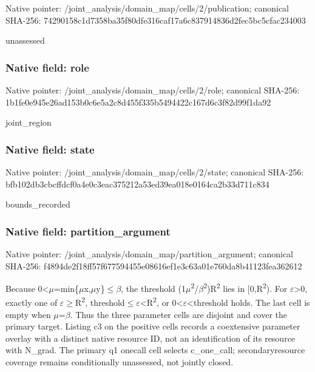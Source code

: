 \documentclass[10pt,a4paper]{article}
\begin{document}
Native pointer: /joint\_analysis/domain\_m\allowbreak{}ap/cells/2/publication; canonical SHA-256: 74290158c1d7358ba35f80df\allowbreak{}e316caf17a6c837914836d2f\allowbreak{}ec5bc5cfac234003


unassessed


\subsubsection{Native field: role}


Native pointer: /joint\_analysis/domain\_map/cells/2/role; canonical SHA-256: 1b1fe0e945e26ad153b0c6e5\allowbreak{}a2c8d455f335b5494422c167\allowbreak{}d6c3f82d99f1da92


joint\_region


\subsubsection{Native field: state}


Native pointer: /joint\_analysis/domain\_m\allowbreak{}ap/cells/2/state; canonical SHA-256: bfb102db3cbcffdcf0a4e0c3\allowbreak{}eac375212a53ed39ea018e01\allowbreak{}64ca2b33d711c834


bounds\_recorded


\subsubsection{Native field: partition\_argument}


Native pointer: /joint\_analysis/domain\_m\allowbreak{}ap/partition\_argument; canonical SHA-256: f4894de2f18ff57f67759445\allowbreak{}5e08616ef1e3c63a01e760da\allowbreak{}8b41123fea362612


Because 0<\ensuremath{\mu}=min\{\ensuremath{\mu}x,\ensuremath{\mu}y\}\ensuremath{\le}\ensuremath{\beta}, the threshold (1\ensuremath{\mu}\textsuperscript{2}/\ensuremath{\beta}\textsuperscript{2})R\textsuperscript{2} lies in [0,R\textsuperscript{2}). For \ensuremath{\varepsilon}>0, exactly one of \ensuremath{\varepsilon}\ensuremath{\ge}R\textsuperscript{2}, threshold\ensuremath{\le}\ensuremath{\varepsilon}<R\textsuperscript{2}, or 0<\ensuremath{\varepsilon}<threshold holds. The last cell is empty when \ensuremath{\mu}=\ensuremath{\beta}. Thus the three parameter cells are disjoint and cover the primary target. Listing c3 on the positive cells records a coextensive parameter overlay with a distinct native resource ID, not an identification of its resource with N\_grad. The primary q1 onecall cell selects c\_one\_call; secondaryresource coverage remains conditionally unassessed, not jointly closed.
\end{document}
